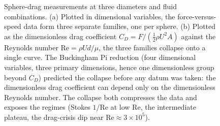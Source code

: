 \begin{figure}[htbp]
\begin{tikzpicture}[font=\small]
\end{tikzpicture}
\caption[Data collapse under the Buckingham Pi reduction]{Sphere-drag
measurements at three diameters and fluid combinations. (a) Plotted in
dimensional variables, the force-versus-speed data form three separate
families, one per sphere. (b) Plotted as the dimensionless drag
coefficient $C_D = F / (\tfrac{1}{2}\rho U^2 A)$ against the Reynolds
number $\mathrm{Re} = \rho U d / \mu$, the three families collapse onto a
single curve. The Buckingham Pi reduction (four dimensional variables,
three primary dimensions, hence one dimensionless group beyond $C_D$)
predicted the collapse before any datum was taken: the dimensionless drag
coefficient can depend only on the dimensionless Reynolds number. The
collapse both compresses the data and exposes the regimes (Stokes
$1/\mathrm{Re}$ at low $\mathrm{Re}$, the intermediate plateau, the
drag-crisis dip near $\mathrm{Re}\approx 3\times 10^5$).}
\label{fig:vol02:ch18:buckingham-collapse}
\end{figure}
